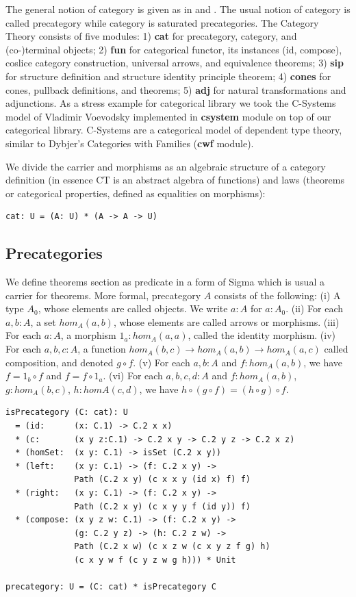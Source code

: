 \documentclass{article}
\begin{document}
The general notion of category is given as in \cite{Shulman15} and \cite{HoTT}.
The usual notion of category is called precategory while category is saturated precategories.
The Category Theory consists of five modules: 1) {\bf cat} for precategory, category, and (co-)terminal objects;
2) {\bf fun} for categorical functor, its instances (id, compose), coslice category construction,
universal arrows, and equivalence theorems; 3) {\bf sip} for structure definition and
structure identity principle theorem; 4) {\bf cones} for cones, pullback definitions, and theorems;
5) {\bf adj} for natural transformations and adjunctions. As a stress example for categorical library
we took the C-Systems model of Vladimir Voevodsky implemented in {\bf csystem} module on
top of our categorical library. C-Systems are a categorical model of dependent type theory,
similar to Dybjer's Categories with Families ({\bf cwf} module).

We divide the carrier and morphisms as an algebraic structure of a category
definition (in essence CT is an abstract algebra of functions) and laws (theorems
or categorical properties, defined as equalities on morphisms):

\begin{lstlisting}[mathescape=true]
cat: U = (A: U) * (A -> A -> U)
\end{lstlisting}

\subsection{Precategories}

We define theorems section as predicate in a form of Sigma
which is usual a carrier for theorems. More formal, precategory $A$ consists of the following:
(i)   A type $A_0$, whose elements are called objects. We write $a: A$ for $a: A_0$.
(ii)  For each $a,b: A$, a set $hom_A(a,b)$, whose elements are called arrows or morphisms.
(iii) For each $a: A$, a morphism $1_a : hom_A(a,a)$, called the identity morphism.
(iv)  For each $a,b,c: A$, a function $hom_A(b,c) \rightarrow hom_A(a,b) \rightarrow hom_A(a,c)$
      called composition, and denoted $g \circ f$.
(v)   For each $a,b: A$ and $f: hom_A(a,b)$, we have $f = 1_b \circ f$ and $f = f \circ 1_a$.
(vi)  For each $a,b,c,d: A$ and $f: hom_A(a,b)$, $g: hom_A(b,c)$, $h: homA(c,d)$,
      we have $h \circ (g \circ f ) = (h \circ g) \circ f$.

\begin{lstlisting}[mathescape=true]
isPrecategory (C: cat): U
  = (id:      (x: C.1) -> C.2 x x)
  * (c:       (x y z:C.1) -> C.2 x y -> C.2 y z -> C.2 x z)
  * (homSet:  (x y: C.1) -> isSet (C.2 x y))
  * (left:    (x y: C.1) -> (f: C.2 x y) ->
              Path (C.2 x y) (c x x y (id x) f) f)
  * (right:   (x y: C.1) -> (f: C.2 x y) ->
              Path (C.2 x y) (c x y y f (id y)) f)
  * (compose: (x y z w: C.1) -> (f: C.2 x y) ->
              (g: C.2 y z) -> (h: C.2 z w) ->
              Path (C.2 x w) (c x z w (c x y z f g) h)
              (c x y w f (c y z w g h))) * Unit

precategory: U = (C: cat) * isPrecategory C
\end{lstlisting}
\end{document}

